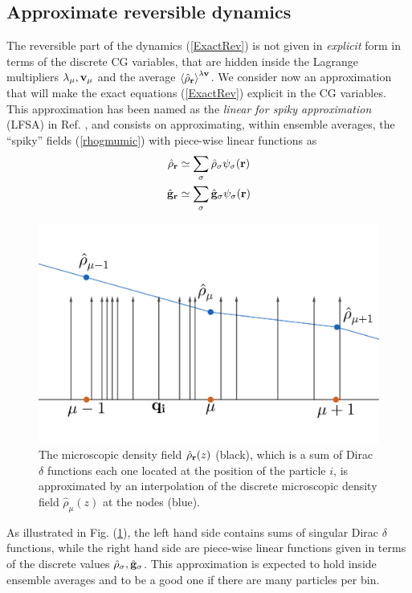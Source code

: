 \documentclass[b5paper,openright,10pt]{book}
\newcommand{\llangle}{\left\langle}
\newcommand{\rrangle}{\right\rangle}
\begin{document}
\subsection{Approximate reversible dynamics}
The reversible part  of the dynamics (\ref{ExactRev}) is  not given in
\textit{explicit} form in terms of the discrete CG variables, that are
hidden inside  the Lagrange multipliers $\lambda_\mu,{\bf  v}_\mu$ and
the  average $\llangle  \hat{\rho}_{\bf r}\rrangle^{\lambda{\bf  v}}$.
We consider  now an approximation  that will make the  exact equations
(\ref{ExactRev}) explicit in the CG variables.  This approximation has
been named  as the \textit{linear  for spiky approximation}  (LFSA) in
Ref.   \cite{Donev},  and  consists on  approximating,  within  ensemble
averages,  the ``spiky''  fields (\ref{rhogmumic})  with piece-wise
linear functions as 
\begin{align}
  \hat{\rho}_{\bf r}&\simeq \sum_\sigma\hat{\rho}_{\sigma} \psi_\sigma({\bf r})
\nonumber\\
  \hat{\bf g}_{\bf r} &\simeq \sum_\sigma\hat{\bf g}_{\sigma} \psi_\sigma({\bf r})
\label{LFSA}
\end{align}
\begin{figure}
    \centering
    \includegraphics[scale=0.2]{spiky}
    \caption[Visual representation of the ``spiky'' approximation]{The microscopic density field $\hat{\rho}_{\bf r}{\bf}(z)$ (black), which is a sum of Dirac $\delta$ functions each one located at the position of the particle $i$, is approximated by an interpolation of the discrete microscopic density field $\hat{\rho}_{\mu}(z)$ at the nodes (blue).}
    \label{fig:spiky}
\end{figure}
As illustrated in Fig. (\ref{fig:spiky}), the left  hand side contains  sums of singular Dirac  $\delta$ functions,
while the  right hand  side are piece-wise  linear functions  given in
terms   of   the  discrete   values   $\hat{\rho}_{\sigma} ,\hat{\bf
  g}_\sigma $.   This  approximation  is  expected  to  hold  inside
ensemble averages and to be a good one if there are many particles per
bin. 
\end{document}
